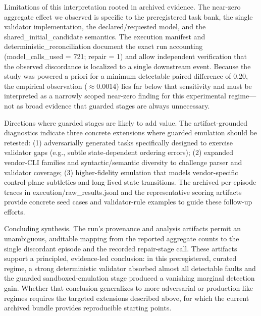 \documentclass[conference]{IEEEtran}
\begin{document}
Limitations of this interpretation rooted in archived evidence. The near-zero aggregate effect we observed is specific to the preregistered task bank, the single validator implementation, the declared/requested model, and the shared\_initial\_candidate semantics. The execution manifest and deterministic\_reconciliation document the exact run accounting (model\_calls\_used = 721; repair = 1) and allow independent verification that the observed discordance is localized to a single downstream event. Because the study was powered a priori for a minimum detectable paired difference of 0.20, the empirical observation (\ensuremath{\approx}0.0014) lies far below that sensitivity and must be interpreted as a narrowly scoped near-zero finding for this experimental regime---not as broad evidence that guarded stages are always unnecessary.

Directions where guarded stages are likely to add value. The artifact-grounded diagnostics indicate three concrete extensions where guarded emulation should be retested: (1) adversarially generated tasks specifically designed to exercise validator gaps (e.g., subtle state-dependent ordering errors); (2) expanded vendor-CLI families and syntactic/semantic diversity to challenge parser and validator coverage; (3) higher-fidelity emulation that models vendor-specific control-plane subtleties and long-lived state transitions. The archived per-episode traces in execution/raw\_results.jsonl and the representative scoring artifacts provide concrete seed cases and validator-rule examples to guide these follow-up efforts.

Concluding synthesis. The run's provenance and analysis artifacts permit an unambiguous, auditable mapping from the reported aggregate counts to the single discordant episode and the recorded repair-stage call. These artifacts support a principled, evidence-led conclusion: in this preregistered, curated regime, a strong deterministic validator absorbed almost all detectable faults and the guarded sandboxed-emulation stage produced a vanishing marginal detection gain. Whether that conclusion generalizes to more adversarial or production-like regimes requires the targeted extensions described above, for which the current archived bundle provides reproducible starting points.
\end{document}
